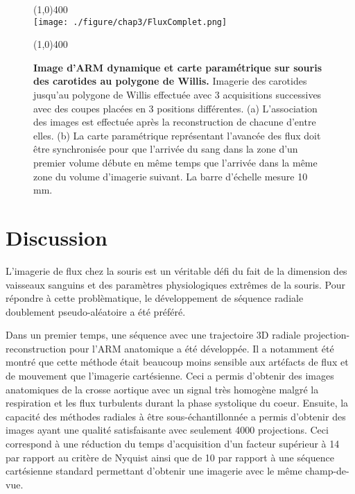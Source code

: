 \begin{figure}[H]
\centering \line(1,0){400} \\
\texttt{[image: ./figure/chap3/FluxComplet.png]}
\caption[Image d'ARM dynamique et carte paramétrique sur souris des carotides au polygone de Willis.]{\label{fig:FluxComplet} \textbf{Image d'ARM dynamique et carte paramétrique sur souris des carotides au polygone de Willis.} Imagerie des carotides jusqu'au polygone de Willis effectuée avec 3 acquisitions successives avec des coupes placées en 3 positions différentes. (a) L'association des images est effectuée après la reconstruction de chacune d'entre elles. (b) La carte paramétrique représentant l'avancée des flux doit être synchronisée pour que l'arrivée du sang dans la zone d'un premier volume débute en même temps que l'arrivée dans la même zone du volume d'imagerie suivant. La barre d'échelle mesure 10 mm.}
\line(1,0){400} \\ \end{figure}

\section{Discussion}

L'imagerie de flux chez la souris est un véritable défi du fait de la dimension des vaisseaux sanguins et des paramètres physiologiques extrêmes de la souris. Pour répondre à cette problèmatique, le développement de séquence radiale doublement pseudo-aléatoire a été préféré.

Dans un premier temps, une séquence avec une trajectoire 3D radiale projection-reconstruction pour l’ARM anatomique a été développée. Il a notamment été montré que cette méthode était beaucoup moins sensible aux artéfacts de flux et de mouvement que l’imagerie cartésienne. Ceci a permis d’obtenir des images anatomiques de la crosse aortique avec un signal très homogène malgré la respiration et les flux turbulents durant la phase systolique du coeur. Ensuite, la capacité des méthodes radiales à être sous-échantillonnée a permis d’obtenir des images ayant une qualité satisfaisante avec seulement 4000 projections. Ceci correspond à une réduction du temps d’acquisition d'un facteur supérieur à 14 par rapport au critère de Nyquist ainsi que de 10 par rapport à une séquence cartésienne standard permettant d’obtenir une imagerie avec le même champ-de-vue. 

